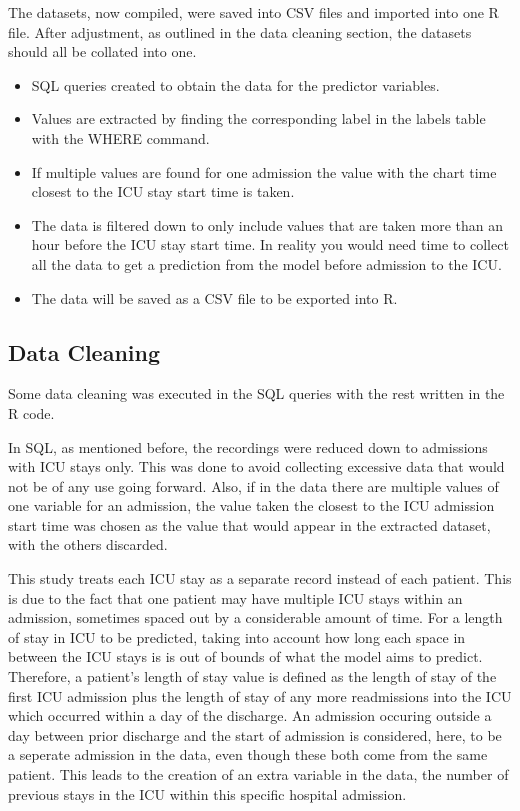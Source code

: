 \documentclass[11pt]{article}
\begin{document}
The datasets, now compiled, were saved into CSV files and imported into one R file. After adjustment, as outlined in the data cleaning section, the datasets should all be collated into one.

\begin{itemize}
    \item SQL queries created to obtain the data for the predictor variables.
    \item Values are extracted by finding the corresponding label in the labels table with the WHERE command.
    \item If multiple values are found for one admission the value with the chart time closest to the ICU stay start time is taken.
    \item The data is filtered down to only include values that are taken more than an hour before the ICU stay start time. In reality you would need time to collect all the data to get a prediction from the model before admission to the ICU.
    \item The data will be saved as a CSV file to be exported into R.
\end{itemize}

\subsection{Data Cleaning}
Some data cleaning was executed in the SQL queries with the rest written in the R code. 

In SQL, as mentioned before, the recordings were reduced down to admissions with ICU stays only. This was done to avoid collecting excessive data that would not be of any use going forward. Also, if in the data there are multiple values of one variable for an admission, the value taken the closest to the ICU admission start time was chosen as the value that would appear in the extracted dataset, with the others discarded.

This study treats each ICU stay as a separate record instead of each patient. This is due to the fact that one patient may have multiple ICU stays within an admission, sometimes spaced out by a considerable amount of time. For a length of stay in ICU to be predicted, taking into account how long each space in between the ICU stays is is out of bounds of what the model aims to predict. Therefore, a patient's length of stay value is defined as the length of stay of the first ICU admission plus the length of stay of any more readmissions into the ICU which occurred within a day of the discharge. An admission occuring outside a day between prior discharge and the start of admission is considered, here, to be a seperate admission in the data, even though these both come from the same patient. This leads to the creation of an extra variable in the data, the number of previous stays in the ICU within this specific hospital admission.
\end{document}

